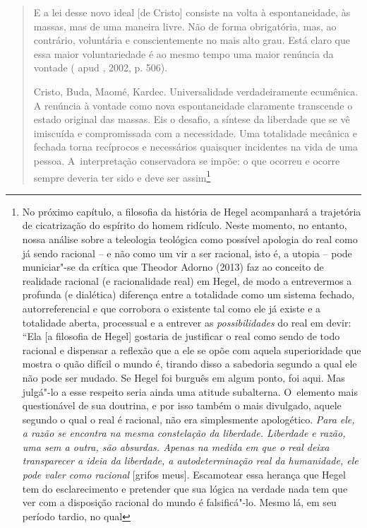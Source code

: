 {\begin{quote}
E a lei desse novo ideal {[}de Cristo{]} consiste na volta à
espontaneidade, às massas, mas de uma maneira livre. Não de forma
obrigatória, mas, ao contrário, voluntária e conscientemente no mais
alto grau. Está claro que essa maior voluntariedade é ao mesmo tempo uma
maior renúncia da vontade ( apud , 2002, p. 506).

Cristo, Buda, Maomé, Kardec. Universalidade verdadeiramente ecumênica. A
renúncia à vontade como nova espontaneidade claramente transcende o
estado original das massas. Eis o desafio, a síntese da liberdade que se
vê imiscuída e compromissada com a necessidade. Uma totalidade mecânica
e fechada torna recíprocos e necessários quaisquer incidentes na vida de
uma pessoa. A~interpretação conservadora se impõe: o que ocorreu e
ocorre sempre deveria ter sido e deve ser assim\footnote{No próximo
  capítulo, a filosofia da história de Hegel acompanhará a trajetória de
  cicatrização do espírito do homem ridículo. Neste momento, no entanto,
  nossa análise sobre a teleologia teológica como possível apologia do
  real como já sendo racional -- e não como um vir a ser racional, isto
  é, a utopia -- pode municiar"-se da crítica que Theodor Adorno (2013)
  faz ao conceito de realidade racional (e racionalidade real) em Hegel,
  de modo a entrevermos a profunda (e dialética) diferença entre a
  totalidade como um sistema fechado, autorreferencial e que corrobora o
  existente tal como ele já existe e a totalidade aberta, processual e a
  entrever as \emph{possibilidades} do real em devir: ``Ela {[}a
  filosofia de Hegel{]} gostaria de justificar o real como sendo de todo
  racional e dispensar a reflexão que a ele se opõe com aquela
  superioridade que mostra o quão difícil o mundo é, tirando disso a
  sabedoria segundo a qual ele não pode ser mudado. Se Hegel foi burguês
  em algum ponto, foi aqui. Mas julgá"-lo a esse respeito seria ainda uma
  atitude subalterna. O~elemento mais questionável de sua doutrina, e
  por isso também o mais divulgado, aquele segundo o qual o real é
  racional, não era simplesmente apologético. \emph{Para ele, a razão se
  encontra na mesma constelação da liberdade. Liberdade e razão, uma sem
  a outra, são absurdas. Apenas na medida em que o real deixa
  transparecer a ideia da liberdade, a autodeterminação real da
  humanidade, ele pode valer como racional} {[}grifos meus{]}.
  Escamotear essa herança que Hegel tem do esclarecimento e pretender
  que sua lógica na verdade nada tem que ver com a disposição racional
  do mundo é falsificá"-lo. Mesmo lá, em seu período tardio, no qual
}
\end{quote}}
